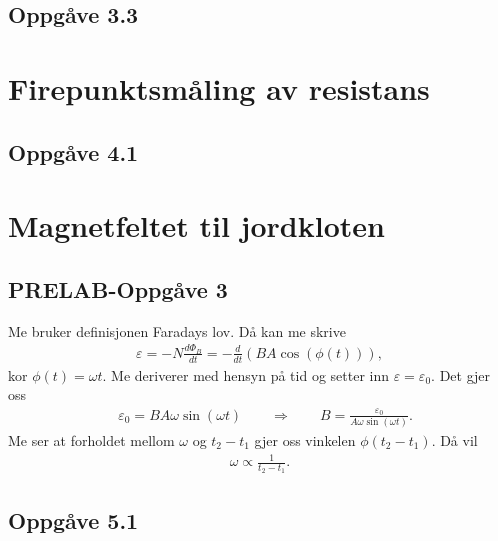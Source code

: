 \documentclass[11pt, a4paper]{article}
\begin{document}
  \subsection*{Oppgåve 3.3}





\newpage




\section*{Firepunktsmåling av resistans}


  \subsection*{Oppgåve 4.1}




\newpage




\section*{Magnetfeltet til jordkloten}


  \subsection*{PRELAB-Oppgåve 3}
    Me bruker definisjonen Faradays lov. Då kan me skrive
    \begin{align*}
      \varepsilon = -N\frac{d\Phi_{B}}{dt} = -\frac{d}{dt}\left( BA\cos(\phi(t)) \right),
    \end{align*}
    kor $\phi(t) = \omega t$. Me deriverer med hensyn på tid og setter inn $\varepsilon = \varepsilon_0$. Det gjer oss
    \begin{align*}
      &\varepsilon_0 = BA\omega\sin(\omega t) \qquad \Rightarrow \qquad B = \frac{\varepsilon_0}{A\omega\sin(\omega t)}.
    \end{align*}
    Me ser at forholdet mellom $\omega$ og $t_2 - t_1$ gjer oss vinkelen $\phi(t_2 - t_1)$. Då vil
    \begin{align*}
      \omega \propto \frac{1}{t_2 - t_1}.
    \end{align*}



  \subsection*{Oppgåve 5.1}
\end{document}
